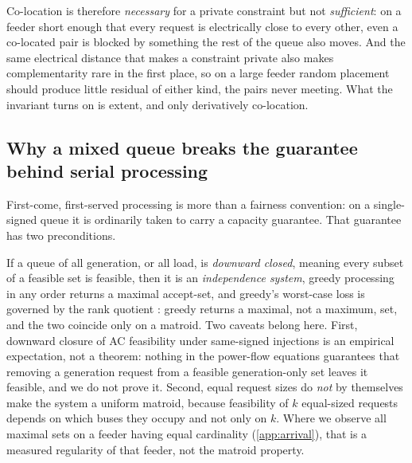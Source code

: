 \documentclass[review,authoryear,12pt]{elsarticle}
\begin{document}
Co-location
is therefore \emph{necessary} for a private constraint but not
\emph{sufficient}: on a
feeder short enough that every request is electrically close to every other,
even a co-located pair is blocked by something the rest of the queue also
moves. And the same electrical distance that makes a constraint private also
makes complementarity rare in the first place, so on a large feeder random
placement should produce little residual of either kind, the pairs never
meeting. What the invariant turns on is extent, and only derivatively
co-location.

\subsection{Why a mixed queue breaks the guarantee behind serial processing}
\label{sec:theory-gs}

First-come, first-served processing is more than a fairness convention: on a
single-signed queue it is ordinarily taken to carry a capacity guarantee. That guarantee has two
preconditions.

If a queue of all generation, or all load, is \emph{downward closed}, meaning
every subset of a feasible set is feasible, then it is an \emph{independence
system}, greedy processing in any order returns a maximal accept-set, and
greedy's worst-case loss is governed by the rank quotient
\citep{jenkyns1976,korte1978}: greedy returns a maximal, not a maximum, set,
and the two coincide only on a matroid. Two caveats belong here. First,
downward closure of AC feasibility under same-signed
injections is an empirical expectation, not a theorem: nothing in the power-flow
equations guarantees that removing a generation request from a feasible
generation-only set leaves it feasible, and we do not prove it. Second, equal
request sizes do \emph{not} by themselves make the system a uniform matroid,
because feasibility of $k$ equal-sized requests depends on which buses they
occupy and not only on $k$. Where we observe all maximal sets on a feeder
having equal cardinality (\ref{app:arrival}), that is a measured regularity of
that feeder, not the matroid property.
\end{document}
